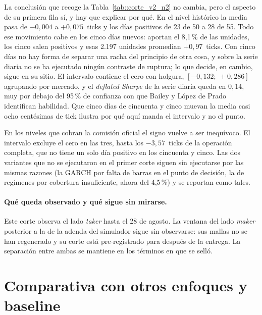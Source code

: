 La conclusión que recoge la Tabla~\ref{tab::corte_v2_n2} no cambia, pero el aspecto de su
primera fila sí, y hay que explicar por qué. En el nivel histórico la media pasa de
$-0{,}004$ a $+0{,}075$~ticks y los días positivos de 23 de 50 a 28 de 55. Todo ese
movimiento cabe en los cinco días nuevos: aportan el 8,1\,\% de las unidades, los cinco
salen positivos y esas 2.197 unidades promedian $+0{,}97$~ticks. Con cinco días no hay
forma de separar una racha del principio de otra cosa, y sobre la serie diaria no se ha
ejecutado ningún contraste de ruptura; lo que decide, en cambio, sigue en su sitio. El
intervalo contiene el cero con holgura, $[-0{,}132;\ +0{,}286]$ agrupando por mercado, y
el \emph{deflated Sharpe} de la serie diaria queda en $0{,}14$, muy por debajo del
95\,\% de confianza con que Bailey y López de Prado~\cite{bailey2014deflated} identifican
habilidad. Que cinco días de cincuenta y cinco muevan la media casi ocho centésimas de
tick ilustra por qué aquí manda el intervalo y no el punto.

En los niveles que cobran la comisión oficial el signo vuelve a ser inequívoco. El intervalo
excluye el cero en las tres, hasta los $-3{,}57$~ticks de la operación completa, que no
tiene un solo día positivo en los cincuenta y cinco. Las dos variantes que no se ejecutaron
en el primer corte siguen sin ejecutarse por las mismas razones (la GARCH por falta de
barras en el punto de decisión, la de regímenes por cobertura insuficiente, ahora del
4,5\,\%) y se reportan como tales.

\paragraph{Qué queda observado y qué sigue sin mirarse.} Este corte observa el lado
\emph{taker} hasta el 28 de agosto. La ventana del lado \emph{maker} posterior a la de la
adenda del simulador sigue sin observarse: sus mallas no se han regenerado y su corte está
pre-registrado para después de la entrega. La separación entre ambas se mantiene en los
términos en que se selló.


\section{Comparativa con otros enfoques y baseline}

